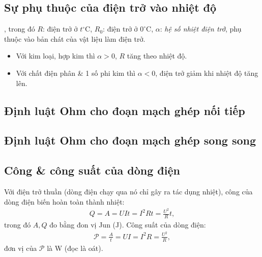 \documentclass{article}
\begin{document}
\subsection{Sự phụ thuộc của điện trở vào nhiệt độ}
, trong đó $R$: điện trở ở $t^\circ$C, $R_0$: điện trở ở $0^\circ$C, $\alpha$: \textit{hệ số nhiệt điện trở}, phụ thuộc vào bản chát của vật liệu làm điện trở.
\begin{itemize}
	\item Với kim loại, hợp kim thì $\alpha > 0$, $R$ tăng theo nhiệt độ.
	\item Với chất điện phân \& 1 số phi kim thì $\alpha < 0$, điện trở giảm khi nhiệt độ tăng lên.
\end{itemize}

\subsection{Định luật Ohm cho đoạn mạch ghép nối tiếp}

\subsection{Định luật Ohm cho đoạn mạch ghép song song}

\subsection{Công \& công suất của dòng điện}
Với điện trở thuần (dòng điện chạy qua nó chỉ gây ra tác dụng nhiệt), công của dòng điện biến hoàn toàn thành nhiệt:
\begin{align*}
	\boxed{Q = A = UIt = I^2Rt = \frac{U^2}{R}t,}
\end{align*}
trong đó $A,Q$ đo bằng đon vị Jun (J). Công suất của dòng điện:
\begin{align*}
	\boxed{\mathcal{P} = \frac{A}{t} = UI = I^2R = \frac{U^2}{R},}
\end{align*}
đơn vị của $\mathcal{P}$ là W (đọc là oát).
\end{document}
